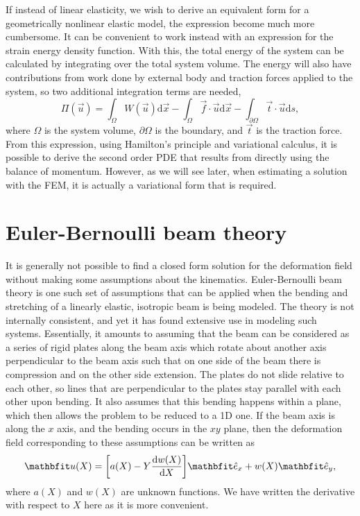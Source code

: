 If instead of linear elasticity, we wish to derive an equivalent form for a geometrically nonlinear elastic model, the expression become much more cumbersome.
It can be convenient to work instead with an expression for the strain energy density function.
With this, the total energy of the system can be calculated by integrating over the total system volume.
The energy will also have contributions from work done by external body and traction forces applied to the system, so two additional integration terms are needed,
\begin{equation}
    \Pi(\vec{u}) = \int_{\Omega} W(\vec{u}) \textrm{d} \vec{x} - \int_{\Omega} \vec{f} \cdot \vec{u} \textrm{d} \vec{x} - \int_{\partial \Omega} \vec{t} \cdot \vec{u} \textrm{d} s,
\end{equation}
where $\Omega$ is the system volume, $\partial \Omega$ is the boundary, and $\vec{t}$ is the traction force.
From this expression, using Hamilton's principle and variational calculus, it is possible to derive the second order \ac{PDE} that results from directly using the balance of momentum.
However, as we will see later, when estimating a solution with the \ac{FEM}, it is actually a variational form that is required.

\section*{Euler-Bernoulli beam theory}
\label{sec:euler-bernoulli-beam-theory}

It is generally not possible to find a closed form solution for the deformation field without making some assumptions about the kinematics.
Euler-Bernoulli beam theory is one such set of assumptions that can be applied when the bending and stretching of a linearly elastic, isotropic beam is being modeled.
The theory is not internally consistent, and yet it has found extensive use in modeling such systems.
Essentially, it amounts to assuming that the beam can be considered as a series of rigid plates along the beam axis which rotate about another axis perpendicular to the beam axis such that on one side of the beam there is compression and on the other side extension.
The plates do not slide relative to each other, so lines that are perpendicular to the plates stay parallel with each other upon bending.
It also assumes that this bending happens within a plane, which then allows the problem to be reduced to a 1D one.
If the beam axis is along the $x$ axis, and the bending occurs in the $xy$ plane, then the deformation field corresponding to these assumptions can be written as
\begin{equation}
    \vec{u}(X) = \mleft[a(X) - Y \frac{\mathrm{d} w(X)}{\mathrm{d} X} \mright] \unitvec_{x} + w(X) \unitvec_{y},
\end{equation}
where $a(X)$ and $w(X)$ are unknown functions.
We have written the derivative with respect to $X$ here as it is more convenient.

